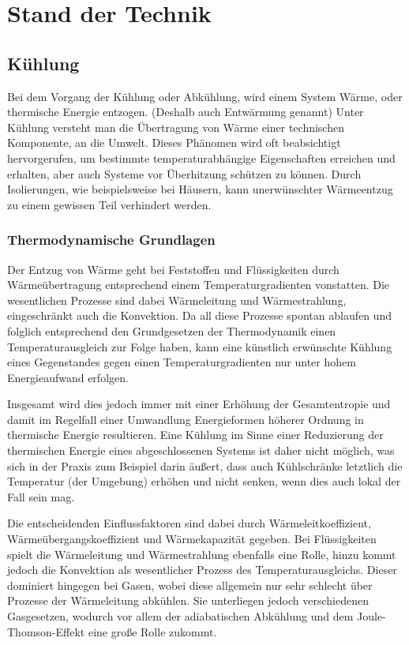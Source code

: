 \chapter{Stand der Technik} \label{Stand der Technik}


\section{Kühlung} 

Bei dem Vorgang der Kühlung oder Abkühlung, wird einem System Wärme, oder thermische Energie entzogen. (Deshalb auch Entwärmung genannt)
Unter Kühlung versteht man die Übertragung von Wärme einer technischen Komponente, an die Umwelt. Dieses Phänomen wird oft beabsichtigt hervorgerufen, um bestimmte temperaturabhängige Eigenschaften erreichen und erhalten, aber auch Systeme vor Überhitzung schützen zu können. 
Durch Isolierungen, wie beispielsweise bei Häusern, kann unerwünschter Wärmeentzug zu einem gewissen Teil verhindert werden.

\subsection{Thermodynamische Grundlagen}

Der Entzug von Wärme geht bei Feststoffen und Flüssigkeiten durch Wärmeübertragung entsprechend einem Temperaturgradienten vonstatten. Die wesentlichen Prozesse sind dabei Wärmeleitung und Wärmestrahlung, eingeschränkt auch die Konvektion. Da all diese Prozesse spontan ablaufen und folglich entsprechend den Grundgesetzen der Thermodynamik einen Temperaturausgleich zur Folge haben, kann eine künstlich erwünschte Kühlung eines Gegenstandes gegen einen Temperaturgradienten nur unter hohem Energieaufwand erfolgen. 

Insgesamt wird dies jedoch immer mit einer Erhöhung der Gesamtentropie und damit im Regelfall einer Umwandlung Energieformen höherer Ordnung in thermische Energie resultieren. Eine Kühlung im Sinne einer Reduzierung der thermischen Energie eines abgeschlossenen Systems ist daher nicht möglich, was sich in der Praxis zum Beispiel darin äußert, dass auch Kühlschränke letztlich die Temperatur (der Umgebung) erhöhen und nicht senken, wenn dies auch lokal der Fall sein mag.

Die entscheidenden Einflussfaktoren sind dabei durch Wärmeleitkoeffizient, Wärmeübergangskoeffizient und Wärmekapazität gegeben. Bei Flüssigkeiten spielt die Wärmeleitung und Wärmestrahlung ebenfalls eine Rolle, hinzu kommt jedoch die Konvektion als wesentlicher Prozess des Temperaturausgleichs. Dieser dominiert hingegen bei Gasen, wobei diese allgemein nur sehr schlecht über Prozesse der Wärmeleitung abkühlen. Sie unterliegen jedoch verschiedenen Gasgesetzen, wodurch vor allem der adiabatischen Abkühlung und dem Joule-Thomson-Effekt eine große Rolle zukommt. 

